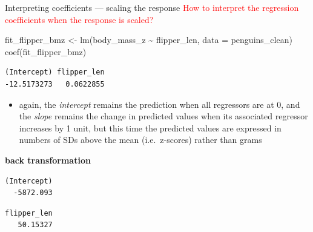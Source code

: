 \documentclass[
  10pt,
  ignorenonframetext,
  aspectratio=169,
  t]{beamer}
\newenvironment{Shaded}{\begin{snugshade}}{\end{snugshade}}
\newcommand{\AttributeTok}[1]{\textcolor[rgb]{0.40,0.45,0.13}{#1}}
\newcommand{\FunctionTok}[1]{\textcolor[rgb]{0.28,0.35,0.67}{#1}}
\newcommand{\NormalTok}[1]{\textcolor[rgb]{0.00,0.23,0.31}{#1}}
\newcommand{\OtherTok}[1]{\textcolor[rgb]{0.00,0.23,0.31}{#1}}
\newcommand{\SpecialCharTok}[1]{\textcolor[rgb]{0.37,0.37,0.37}{#1}}
\newcommand{\StringTok}[1]{\textcolor[rgb]{0.13,0.47,0.30}{#1}}
\providecommand{\tightlist}{%
  \setlength{\itemsep}{0pt}\setlength{\parskip}{0pt}}
\newcommand{\blueit}[1]{\textcolor{bluebeamer}{\emph{#1}}}
\newcommand{\bluebold}[1]{\textcolor{bluebeamer}{\textbf{#1}}}
\begin{document}
\begin{frame}[fragile]{Interpreting coefficients --- scaling the
response}
\protect{}\label{interpreting-coefficients-scaling-the-response}
\textcolor{red}{How to interpret the regression coefficients when the response is scaled?}

\footnotesize

\begin{Shaded}
\begin{Highlighting}[]
\NormalTok{fit\_flipper\_bmz }\OtherTok{\textless{}{-}} \FunctionTok{lm}\NormalTok{(body\_mass\_z }\SpecialCharTok{\textasciitilde{}}\NormalTok{ flipper\_len, }\AttributeTok{data =}\NormalTok{ penguins\_clean)}
\FunctionTok{coef}\NormalTok{(fit\_flipper\_bmz)}
\end{Highlighting}
\end{Shaded}

\begin{verbatim}
(Intercept) flipper_len 
-12.5173273   0.0622855 
\end{verbatim}

\normalsize

\begin{itemize}
\tightlist
\item
  again, the \blueit{intercept} remains the prediction when all
  regressors are at 0, and the \blueit{slope} remains the change in
  predicted values when its associated regressor increases by 1 unit,
  but this time the predicted values are expressed in numbers of SDs
  above the mean (i.e.~z-scores) rather than grams
\end{itemize}

\bluebold{back transformation}

\footnotesize

\begin{Shaded}
\end{Shaded}

\begin{verbatim}
(Intercept) 
  -5872.093 
\end{verbatim}

\begin{Shaded}
\end{Shaded}

\begin{verbatim}
flipper_len 
   50.15327 
\end{verbatim}

\normalsize
\end{frame}
\end{document}
